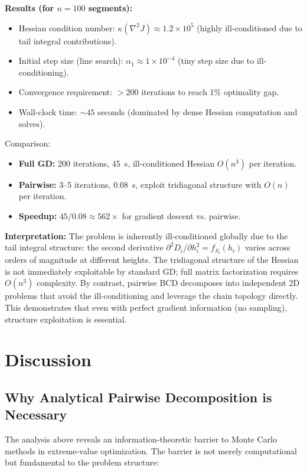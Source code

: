 \documentclass[12pt]{article}
\theoremstyle{definition}
\begin{document}
\textbf{Results (for $n=100$ segments):}
\begin{itemize}
    \item Hessian condition number: $\kappa(\nabla^2 J) \approx 1.2 \times 10^5$ (highly ill-conditioned due to tail integral contributions).
    \item Initial step size (line search): $\alpha_1 \approx 1 \times 10^{-4}$ (tiny step size due to ill-conditioning).
    \item Convergence requirement: $>200$ iterations to reach 1\% optimality gap.
    \item Wall-clock time: $\sim 45$ seconds (dominated by dense Hessian computation and solves).
\end{itemize}

Comparison:
\begin{itemize}
    \item \textbf{Full GD:} 200 iterations, 45~s, ill-conditioned Hessian $O(n^3)$ per iteration.
    \item \textbf{Pairwise:} 3--5 iterations, 0.08~s, exploit tridiagonal structure with $O(n)$ per iteration.
    \item \textbf{Speedup:} $45 / 0.08 \approx 562\times$ for gradient descent vs. pairwise.
\end{itemize}

\textbf{Interpretation:} The problem is inherently ill-conditioned globally due to the tail integral structure: the second derivative $\partial^2 D_i / \partial h_i^2 = f_{S_i}(h_i)$ varies across orders of magnitude at different heights. The tridiagonal structure of the Hessian is not immediately exploitable by standard GD; full matrix factorization requires $O(n^3)$ complexity. By contrast, pairwise BCD decomposes into independent 2D problems that avoid the ill-conditioning and leverage the chain topology directly. This demonstrates that even with perfect gradient information (no sampling), structure exploitation is essential.

\section{Discussion}

\subsection{Why Analytical Pairwise Decomposition is Necessary}

The analysis above reveals an information-theoretic barrier to Monte Carlo methods in extreme-value optimization. The barrier is not merely computational but fundamental to the problem structure:
\end{document}
